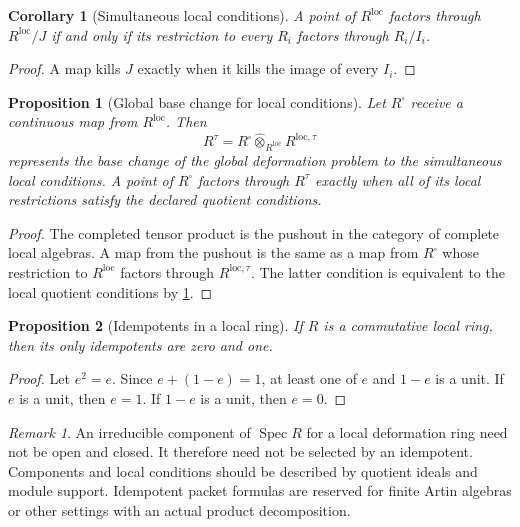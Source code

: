 \documentclass{aomart}
\newtheorem{proposition}[proposition]{Proposition}
\newtheorem{corollary}[corollary]{Corollary}
\theoremstyle{definition}
\theoremstyle{remark}
\newtheorem{remark}[remark]{Remark}
\newcommand{\Spec}{\operatorname{Spec}}
\newcommand{\wideotimes}{\mathbin{\widehat\otimes}}
\begin{document}
\begin{corollary}[Simultaneous local conditions]\label{cor:simultaneous_local}
A point of \(R^{\mathrm{loc}}\) factors through \(R^{\mathrm{loc}}/J\) if and only if its restriction to every \(R_i\) factors through \(R_i/I_i\).
\end{corollary}

\begin{proof}
A map kills \(J\) exactly when it kills the image of every \(I_i\).
\end{proof}

\begin{proposition}[Global base change for local conditions]\label{prop:global_local_basechange}
Let \(R^\square\) receive a continuous map from \(R^{\mathrm{loc}}\). Then
\[
R^{\tau}
=
R^\square\wideotimes_{R^{\mathrm{loc}}}R^{\mathrm{loc},\tau}
\]
represents the base change of the global deformation problem to the simultaneous local conditions. A point of \(R^\square\) factors through \(R^{\tau}\) exactly when all of its local restrictions satisfy the declared quotient conditions.
\end{proposition}

\begin{proof}
The completed tensor product is the pushout in the category of complete local algebras. A map from the pushout is the same as a map from \(R^\square\) whose restriction to \(R^{\mathrm{loc}}\) factors through \(R^{\mathrm{loc},\tau}\). The latter condition is equivalent to the local quotient conditions by \cref{cor:simultaneous_local}.
\end{proof}

\begin{proposition}[Idempotents in a local ring]\label{prop:local_idempotent}
If \(R\) is a commutative local ring, then its only idempotents are zero and one.
\end{proposition}

\begin{proof}
Let \(e^2=e\). Since \(e+(1-e)=1\), at least one of \(e\) and \(1-e\) is a unit. If \(e\) is a unit, then \(e=1\). If \(1-e\) is a unit, then \(e=0\).
\end{proof}

\begin{remark}\label{rem:components_not_idempotents}
An irreducible component of \(\Spec R\) for a local deformation ring need not be open and closed. It therefore need not be selected by an idempotent. Components and local conditions should be described by quotient ideals and module support. Idempotent packet formulas are reserved for finite Artin algebras or other settings with an actual product decomposition.
\end{remark}
\end{document}
